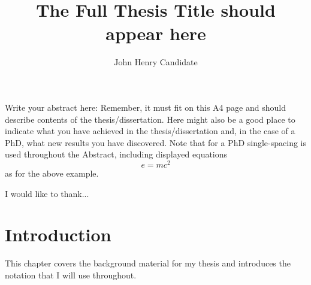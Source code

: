 \documentclass[12pt,MSc,twoside]{muthesis}
\begin{document}
\title{The Full Thesis Title should appear here}
\author{John Henry Candidate}
\def\wordcount{xxxxx}




\beforeabstract

Write your abstract here: Remember, it must fit on this A4 page and should
describe contents of the thesis/dissertation. Here might also be a good place
to indicate what you have achieved in the thesis/dissertation and, in the
case of a PhD, what new results you have discovered. Note that for a PhD
single-spacing is used throughout the Abstract, including displayed equations
\[
e = mc^{2}
\]
as for the above example.

\afterabstract

I would like to thank...

\afterpreface



\chapter{Introduction}
This chapter covers the background material for my thesis and introduces
the notation that I will use throughout.
\end{document}
